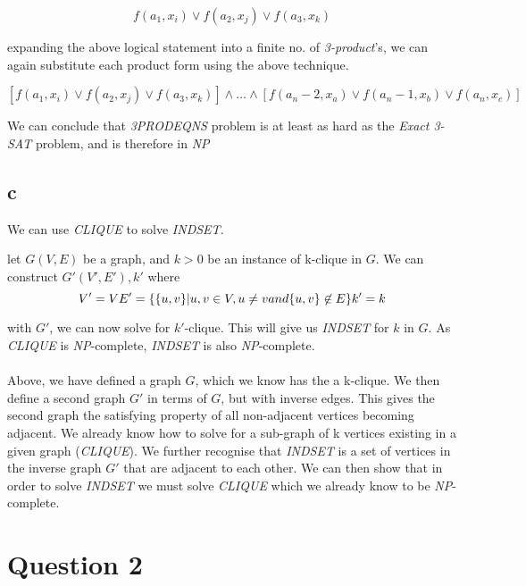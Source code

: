 \documentclass{article}
\begin{document}
\[
  f(a_1, x_i) \vee f(a_2, x_j) \vee f(a_3, x_k)
\]

expanding the above logical statement into a finite no. of \textit{3-product}'s,
we can again substitute each product form using the above technique.

\[
  [f(a_1, x_i) \vee f(a_2, x_j) \vee f(a_3, x_k)] \wedge \ldots  \wedge [f(a_n-2, x_a) \vee f(a_n-1, x_b) \vee f(a_n, x_c)]
\]

We can conclude that \textit{3PRODEQNS} problem is at least as hard as the
\textit{Exact 3-SAT} problem, and is therefore in \textit{NP}

\subsection*{c}
\label{subsec:c}

We can use \textit{CLIQUE} to solve \textit{INDSET}.

let $G(V,E)$ be a graph, and $k > 0$ be an instance of k-clique in $G$.
We can construct $G'(V',E'),k'$ where
\[
  V' = V \\
  E' = \{ \{u, v\} | u, v \in V, u \neq v and \{u,v\} \not \in E \} \\
  k' = k \\
\]

with $G'$, we can now solve for $k'$-clique. This will give us \textit{INDSET}
for $k$ in $G$. As \textit{CLIQUE} is \textit{NP}-complete, \textit{INDSET} is
also \textit{NP}-complete.

\paragraph{}
Above, we have defined a graph $G$, which we know has the a k-clique.
We then define a second graph $G'$ in terms of $G$, but with inverse edges.
This gives the second graph the satisfying property of all non-adjacent vertices
becoming adjacent. We already know how to solve for a sub-graph of k vertices
existing in a given graph (\textit{CLIQUE}). We further recognise that
\textit{INDSET} is a set of vertices in the inverse graph $G'$ that are adjacent
to each other. We can then show that in order to solve \textit{INDSET} we must
solve \textit{CLIQUE} which we already know to be \textit{NP}-complete.

\pagebreak[4]
\section*{Question 2}
\end{document}
